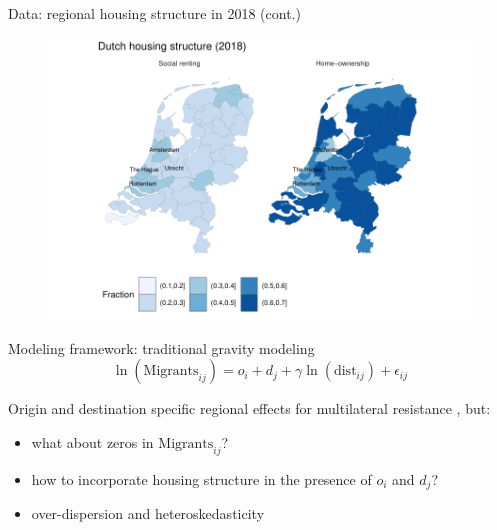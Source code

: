 \documentclass{beamer}
\begin{document}
\begin{frame}{Data: regional housing structure in 2018 (cont.)}
		\begin{figure}
		  \includegraphics[width=1\textwidth]{../../fig/housing_structure}
		  \end{figure}
\end{frame}


\begin{frame}{Modeling framework: traditional gravity modeling}
	\begin{equation*}
	\ln(\text{Migrants}_{ij}) = o_i + d_j + \gamma\ln(\text{dist}_{ij}) + \epsilon_{ij}
	\label{eq:gravfixed}
	\end{equation*} 
	
	Origin and destination specific \alert{regional} effects for multilateral resistance  \citep{anderson2003gravity}, but:
	\begin{itemize}
		\item what about \alert{zeros} in $\text{Migrants}_{ij}$?
		\item how to incorporate \alert{housing} structure in the presence of $o_i$ and $d_j$?
		\item \alert{over-dispersion} and \alert{heteroskedasticity} \footnotesize{\citep{silva2006log} }
	\end{itemize}
\end{frame}
\end{document}
